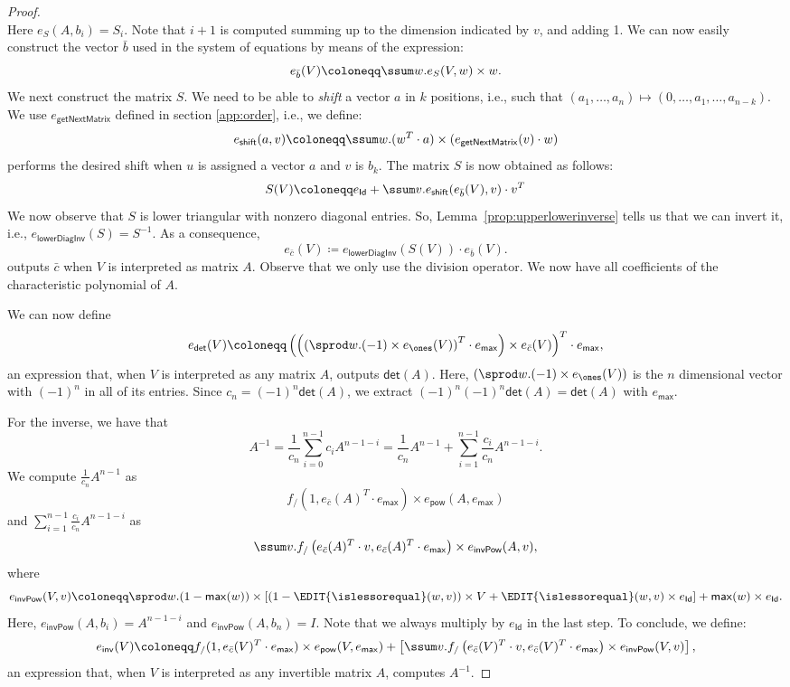\begin{proof}
$$$$
Here $e_{S}(A,b_i)=S_i$. Note that $i+1$ is computed summing up to the dimension indicated by $v$, and adding 1.
We can now easily construct the vector $\bar b$ used in the system of equations by means of the expression:
$$
e_{\bar b}(V)\coloneqq \ssum w.e_{S}(V,w)\times w.
$$
We next construct the matrix $S$. We need to be able to \textit{shift} a vector $a$ in $k$ positions, i.e.,
such that $(a_1,\ldots,a_n)\mapsto (0,\ldots,a_1,\ldots,a_{n-k})$. We use $e_{\mathsf{getNextMatrix}}$ 
defined in section \ref{app:order}, i.e., we define:
$$
e_{\mathsf{shift}}(a,v)\coloneqq \ssum w.(w^T\cdot a)\times(e_{\mathsf{getNextMatrix}}(v)\cdot w)
$$
performs the desired shift when $u$ is assigned a vector $a$ and $v$ is $b_k$. 
The matrix $S$ is now obtained as follows:
$$
S(V)\coloneqq  e_{\mathsf{Id}} + \ssum v. e_{\mathsf{shift}}(e_{\bar b}(V), v)\cdot v^T
$$
We now observe that $S$ is lower triangular with nonzero diagonal entries. So,
Lemma~\ref{prop:upperlowerinverse} tells us that we can invert it, i.e.,
$e_{\mathsf{lowerDiagInv}}(S)=S^{-1}$. As a consequence,
$$
e_{\bar c}(V)\coloneqq e_{\mathsf{lowerDiagInv}}(S(V))\cdot e_{\bar b}(V).
$$
outputs $\bar c$ when $V$ is interpreted as matrix $A$. Observe that we only use the division operator. We now have all coefficients of the characteristic polynomial of $A$.


We can now define
$$
e_{\mathsf{det}}(V)\coloneqq \left( \left(\left( \sprod w. (-1)\times e_{\ones}(V)\right)^T\cdot e_{\mathsf{max}}\right) \times e_{\bar c}(V) \right)^T\cdot e_{\mathsf{max}},
$$
an expression that, when $V$ is interpreted as any matrix $A$, outputs $\mathsf{det}(A)$.
Here, $(\sprod w. (-1)\times e_{\ones}(V))$ is the $n$ dimensional vector with $(-1)^n$ in all of its entries.
Since $c_n=(-1)^n\mathsf{det}(A)$, we extract $(-1)^n(-1)^n\mathsf{det}(A)=\mathsf{det}(A)$ with $e_{\mathsf{max}}$.

For the inverse, we have that
$$
A^{-1}=\frac{1}{c_n}\sum_{i=0}^{n-1}c_i A^{n-1-i} = \frac{1}{c_n}A^{n-1} + \sum_{i=1}^{n-1}\frac{c_i}{c_n}A^{n-1-i}.
$$
We compute $\frac{1}{c_n}A^{n-1}$ as
$$
f_{/}(1, e_{\bar c}(A)^T\cdot e_{\mathsf{max}})\times e_{\mathsf{pow}}(A, e_{\mathsf{max}})
$$
and $\sum_{i=1}^{n-1}\frac{c_i}{c_n}A^{n-1-i}$ as
$$
\ssum v. f_{/}\left( e_{\bar c}(A)^T\cdot v, e_{\bar c}(A)^T\cdot e_{\mathsf{max}} \right)\times e_{\mathsf{invPow}}(A, v),
$$
where
$$
e_{\mathsf{invPow}}(V, v)\coloneqq  \sprod w. (1-\mathsf{max}(w)) \times \left[ (1 - \EDIT{\islessorequal}(w,v))\times V + \EDIT{\islessorequal}(w,v)\times e_{\mathsf{Id}} \right] + \mathsf{max}(w)\times e_{\mathsf{Id}}.
$$
Here, $e_{\mathsf{invPow}}(A, b_i)=A^{n-1-i}$ and $e_{\mathsf{invPow}}(A, b_n)=I$.
Note that we always multiply by $e_{\mathsf{Id}}$ in the last step.
To conclude, we define:
$$
e_{\mathsf{inv}}(V)\coloneqq  f_{/}(1, e_{\bar c}(V)^T\cdot e_{\mathsf{max}})\times e_{\mathsf{pow}}(V, e_{\mathsf{max}}) + \left[ \ssum v. f_{/}\left( e_{\bar c}(V)^T\cdot v, e_{\bar c}(V)^T\cdot e_{\mathsf{max}} \right)\times e_{\mathsf{invPow}}(V, v) \right],
$$
an expression that, when $V$ is interpreted as any invertible matrix $A$, computes $A^{-1}$.
\end{proof}


